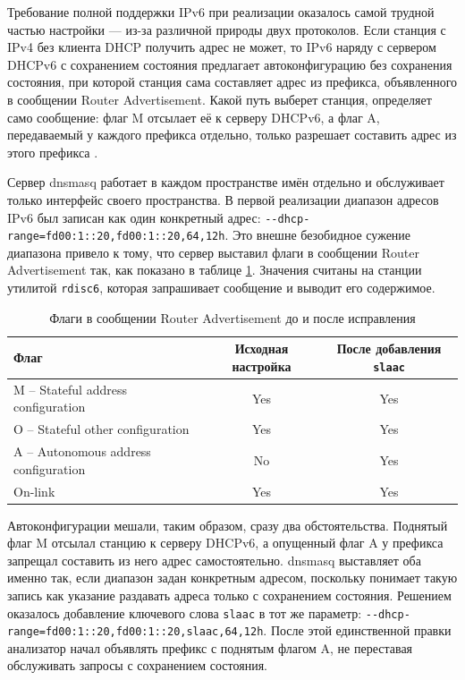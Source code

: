 Требование полной поддержки IPv6 при реализации оказалось самой трудной частью настройки — из-за различной природы двух протоколов. Если станция с IPv4 без клиента DHCP получить адрес не может, то IPv6 наряду с сервером DHCPv6 с сохранением состояния предлагает автоконфигурацию без сохранения состояния, при которой станция сама составляет адрес из префикса, объявленного в сообщении Router Advertisement. Какой путь выберет станция, определяет само сообщение: флаг M отсылает её к серверу DHCPv6, а флаг A, передаваемый у каждого префикса отдельно, только разрешает составить адрес из этого префикса \cite{nastase2024}.

Сервер dnsmasq работает в каждом пространстве имён отдельно и обслуживает только интерфейс своего пространства. В первой реализации диапазон адресов IPv6 был записан как один конкретный адрес: \texttt{-{}-dhcp-range=fd00:1::20,fd00:1::20,64,12h}. Это внешне безобидное сужение диапазона привело к тому, что сервер выставил флаги в сообщении Router Advertisement так, как показано в таблице \ref{tab:ra_flags}. Значения считаны на станции утилитой \texttt{rdisc6}, которая запрашивает сообщение и выводит его содержимое.

\begin{table}[htbp]
    \caption{Флаги в сообщении Router Advertisement до и после исправления}
    \label{tab:ra_flags}
    \centering
    \begin{tabular}{lcc}
        \hline
        Флаг & Исходная настройка & После добавления \texttt{slaac} \\
        \hline
        M -- Stateful address configuration & Yes & Yes \\
        O -- Stateful other configuration & Yes & Yes \\
        A -- Autonomous address configuration & No & Yes \\
        On-link & Yes & Yes \\
        \hline
    \end{tabular}
\end{table}

Автоконфигурации мешали, таким образом, сразу два обстоятельства. Поднятый флаг M отсылал станцию к серверу DHCPv6, а опущенный флаг A у префикса запрещал составить из него адрес самостоятельно. dnsmasq выставляет оба именно так, если диапазон задан конкретным адресом, поскольку понимает такую запись как указание раздавать адреса только с сохранением состояния. Решением оказалось добавление ключевого слова \texttt{slaac} в тот же параметр: \texttt{-{}-dhcp-range=fd00:1::20,fd00:1::20,slaac,64,12h}. После этой единственной правки анализатор начал объявлять префикс с поднятым флагом A, не переставая обслуживать запросы с сохранением состояния.

